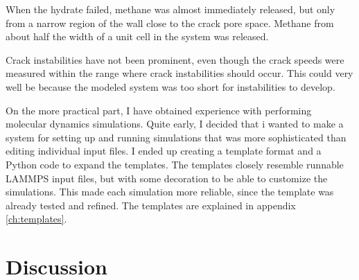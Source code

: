 When the hydrate failed, methane was almost immediately released, but only from a narrow region of the wall close to the crack pore space. Methane from about half the width of a unit cell in the system was released.

Crack instabilities have not been prominent, even though the crack speeds were measured within the range where crack instabilities should occur. This could very well be because the modeled system was too short for instabilities to develop.

On the more practical part, I have obtained experience with performing molecular dynamics simulations. Quite early, I decided that i wanted to make a system for setting up and running simulations that was more sophisticated than editing individual input files. I ended up creating a template format and a Python code to expand the templates. The templates closely resemble runnable LAMMPS input files, but with some decoration to be able to customize the simulations. This made each simulation more reliable, since the template was already tested and refined. The templates are explained in appendix \ref{ch:templates}.


\section{Discussion}

